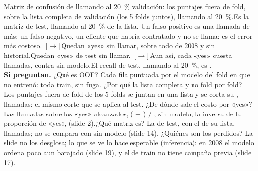 \documentclass[aspectratio=169,11pt]{beamer}
\newcommand{\avanza}{\textcolor{naranja}{\,[$\rightarrow$]\,}}
\begin{document}
\begin{frame}{Matriz de confusión de \modeloFinal{} llamando al 20~\%}
{    validación: los puntajes fuera de fold, sobre la lista completa de validación (los 5 folds
    juntos), llamando al 20~\%.\else Es la matriz de test, llamando al 20~\% de la
    lista.\fi{} Un falso positivo es una llamada de más; un falso negativo, un cliente que
    habría contratado y no se llama: es el error más costoso.
    \avanza \iftestpendiente Quedan \fnRfVal{} «yes» sin llamar, sobre todo de 2008 y sin
    historial.\else Quedan \fntest{} «yes» de test sin llamar.\fi
    \avanza \iftestpendiente Aun así, cada «yes» cuesta \llamadasPorYesRf{} llamadas, contra
    \llamadasPorYesSinModelo{} sin modelo.\else El recall de test, llamando al 20~\%, es
    \recallmatriztest.\fi\\[0.4em]
    \textbf{Si preguntan.} \iftestpendiente ¿Qué es OOF? Cada fila puntuada por el modelo del
    fold en que no entrenó: toda train, sin fuga. ¿Por qué la lista completa y no fold por fold?
    Los puntajes fuera de fold de los 5 folds se juntan en una lista y se corta su \presupuesto,
    \llamadasTrain{} llamadas: el mismo corte que se aplica al test. ¿De dónde sale el costo por
    «yes»? Las llamadas sobre los «yes» alcanzados, (\vpRfVal{} + \fpRfVal) / \vpRfVal; sin
    modelo, la inversa de la proporción de «yes», \pctYesTrain{} (slide 2).\else ¿Qué matriz es?
    La de test, con el \presupuesto{} de su lista, \llamadastest{} llamadas; no se compara con sin
    modelo (slide 14).\fi{} ¿Quiénes son los perdidos? La slide no los desglosa; lo que se ve lo
    hace esperable (inferencia): en 2008 el modelo ordena poco aun barajado (slide 19), y el
    \pctPoutcomeInexistente{} de train no tiene campaña previa (slide 17).}
\end{frame}

\end{document}

